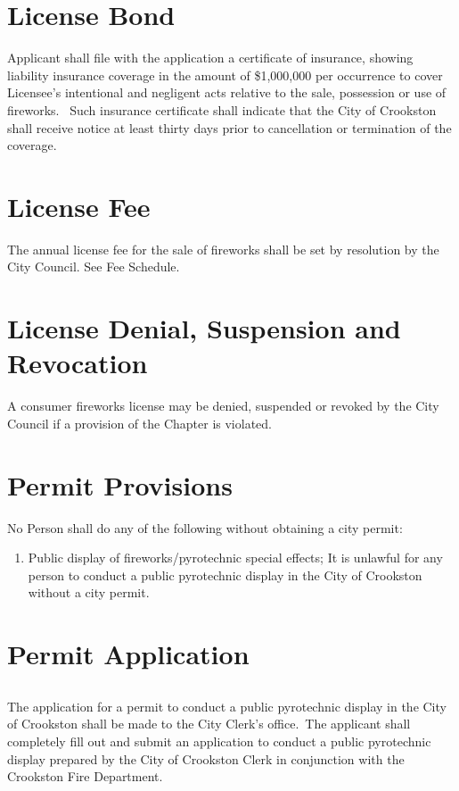 \section{License Bond}
Applicant shall file with the application a certificate of insurance, showing liability insurance coverage in the amount of \$1,000,000 per occurrence to cover Licensee's intentional and negligent acts relative to the sale, possession or use of fireworks.  Such insurance certificate shall indicate that the City of Crookston shall receive notice at least thirty days prior to cancellation or termination of the coverage.
\section{License Fee}
The annual license fee for the sale of fireworks shall be set by resolution by the City Council. See Fee Schedule.
\section{License Denial, Suspension and Revocation}
A consumer fireworks license may be denied, suspended or revoked by the City Council if a provision of the Chapter is violated.
\section{Permit Provisions}
No Person shall do any of the following without obtaining a city permit:
\begin{enumerate}[{\indent}A)]
    \item Public display of fireworks/pyrotechnic special effects; It is unlawful for any person to conduct a public pyrotechnic display in the City of Crookston without a city permit.
\end{enumerate}
\section{Permit Application}
\subsection{}
The application for a permit to conduct a public pyrotechnic display in the City of Crookston shall be made to the City Clerk's office. The applicant shall completely fill out and submit an application to conduct a public pyrotechnic display prepared by the City of Crookston Clerk in conjunction with the Crookston Fire Department.
